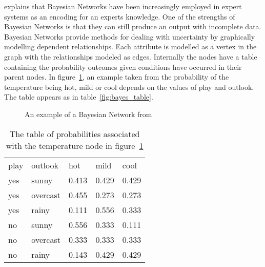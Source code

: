 \cite{export:69588} explains that Bayesian Networks have been increasingly employed in expert systems as an encoding for an experts knowledge. One of the strengths of Bayesian Networks is that they can still produce an output with incomplete data. Bayesian Networks provide methods for dealing with uncertainty by graphically modelling dependent relationships. Each attribute is modelled as a vertex in the graph with the relationships modeled as edges. Internally the nodes have a table containing the probability outcomes given conditions have occurred in their parent nodes. In figure~\ref{fig:test}, an example taken from \cite{witten2005data} the probability of the temperature being hot, mild or cool depends on the values of play and outlook. The table appears as in table~\ref{fig:bayes_table}.

\begin{figure}[h]
\centering
{}
\caption{An example of a Bayesian Network from \cite{witten2005data}}
\label{fig:test}
\end{figure}

\begin{table}[h]
\centering
\begin{tabular}{|ll|lll|}
\hline
 play & outlook & hot & mild & cool \\ \cline{1-5} 
 yes & sunny & 0.413 & 0.429 & 0.429 \\ 
 yes & overcast & 0.455 & 0.273 & 0.273 \\ 
 yes & rainy & 0.111 & 0.556 & 0.333 \\ 
 no & sunny & 0.556 & 0.333 & 0.111 \\ 
 no & overcast & 0.333 & 0.333 & 0.333 \\ 
 no & rainy & 0.143 & 0.429 & 0.429 \\ 
\hline
\end{tabular}
\caption{The table of probabilities associated with the temperature node in figure~\ref{fig:test} }
\label{bayes_table}
\end{table}

